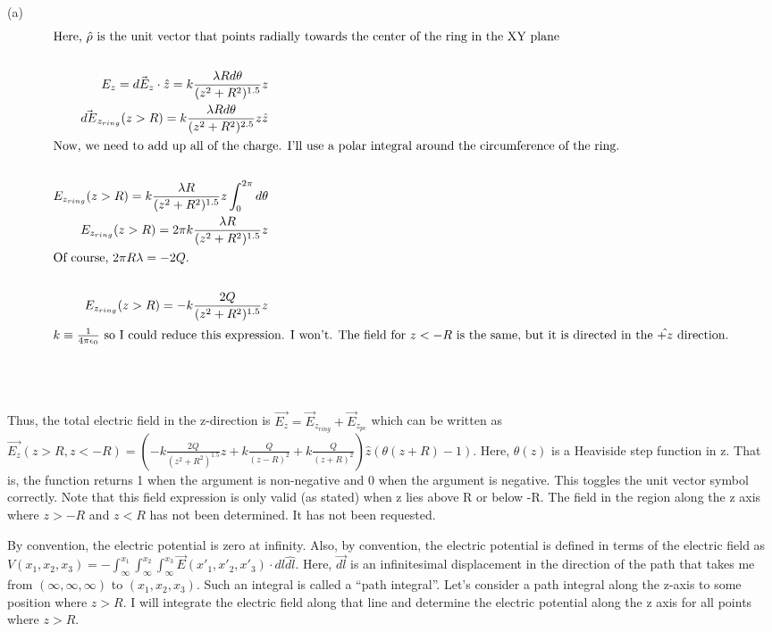 \begin{homeworkProblem}
\begin{homeworkSection}{(a)}
\begin{align}
\intertext{Here, $\hat{\rho}$ is the unit vector that points radially towards the center of the ring in the XY plane} \nonumber \\
E_z = \vec{dE_z} \cdot \hat{z} = k \frac{\lambda R d\theta}{(z^2+R^2)^{1.5}}z \nonumber \\
\vec{dE}_{z_{ring}}(z>R) = k \frac{\lambda R d\theta}{(z^2+R^2)^{2.5}}z \hat{z} \nonumber \\
\intertext{Now, we need to add up all of the charge. I'll use a polar integral around the circumference of the ring.} \nonumber \\
E_{z_{ring}}(z>R) = k \frac{\lambda R}{(z^2+R^2)^{1.5}}z \int_0^{2\pi} d\theta \nonumber \\
E_{z_{ring}}(z>R) = 2\pi k \frac{\lambda R}{(z^2+R^2)^{1.5}}z \nonumber \\
\intertext{Of course, $2\pi R \lambda  = -2Q$.} \nonumber \\
E_{z_{ring}}(z>R) = -k \frac{2Q}{(z^2+R^2)^{1.5}}z \nonumber \\
\intertext{$k \equiv \frac{1}{4\pi \epsilon_0}$ so I could reduce this expression. I won't. The field for $z<-R$ is the same, but it is directed in the $\hat{+z}$ direction.} \nonumber
\end{align}

\\ \par

Thus, the total electric field in the z-direction is $\vec{E_z} = \vec{E}_{z_{ring}} + \vec{E}_{z_{pc}}$ which can be written as $\vec{E_z}(z>R,z<-R) = (-k \frac{2Q}{(z^2+R^2)^{1.5}}z + k \frac{Q}{(z-R)^2} + k \frac{Q}{(z+R)^2} ) \hat{z} (\theta(z+R)-1)$. Here, $\theta (z)$ is a Heaviside step function in z. That is, the function returns 1 when the argument is non-negative and 0 when the argument is negative. This toggles the unit vector symbol correctly. Note that this field expression is only valid (as stated) when z lies above R or below -R. The field in the region along the z axis where $z>-R$ and $z<R$ has not been determined. It has not been requested.
\\ \par
By convention, the electric potential is zero at infinity. Also, by convention, the electric potential is defined in terms of the electric field as $V(x_1,x_2,x_3) = -\int_\infty^{x_1} \int_\infty^{x_2} \int_\infty^{x_3} \vec{E}(x'_1,x'_2,x'_3) \cdot dl \hat{dl}$. Here, $\vec{dl}$ is an infinitesimal displacement in the direction of the path that takes me from $(\infty,\infty,\infty)$ to $(x_1,x_2,x_3)$. Such an integral is called a ``path integral''. Let's consider a path integral along the z-axis to some position where $z>R$. I will integrate the electric field along that line and determine the electric potential along the z axis for all points where $z > R$. 
\\ \par 


\end{homeworkSection}
\end{homeworkProblem}
